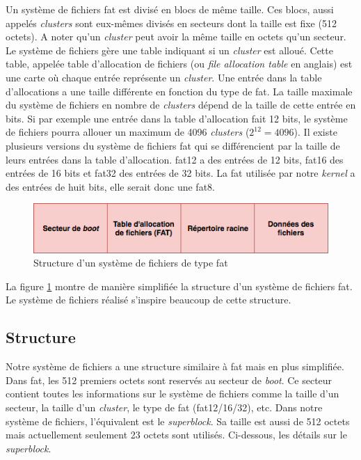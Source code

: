 Un système de fichiers \acrshort{fat} est divisé en blocs de même taille. Ces blocs,
aussi appelés \textit{clusters} sont eux-mêmes divisés en secteurs dont la taille
est fixe (512 octets). A noter qu'un \textit{cluster} peut avoir la même taille
en octets qu'un secteur. Le système de fichiers gère une table indiquant si un
\textit{cluster} est alloué. Cette table, appelée table d'allocation de fichiers
(ou \textit{file allocation table} en anglais) est une carte où chaque entrée
représente un \textit{cluster}. Une entrée dans la table d'allocations a une taille
différente en fonction du type de \acrshort{fat}. La taille maximale du système
de fichiers en nombre de \textit{clusters} dépend de la taille de cette entrée en
bits. Si par exemple une entrée dans la table d'allocation fait 12 bits, le système
de fichiers pourra allouer un maximum de 4096 \textit{clusters} ($2^{12} = 4096$).
Il existe plusieurs versions du système de fichiers \acrshort{fat} qui se
différencient par la taille de leurs entrées dans la table d'allocation.
\acrshort{fat}12 a des entrées de 12 bits, \acrshort{fat}16 des entrées de 16 bits
et \acrshort{fat}32 des entrées de 32 bits. La \acrshort{fat} utilisée par notre
\textit{kernel} a des entrées de huit bits, elle serait donc une \acrshort{fat}8.

\begin{figure}[!h]
  \centering
  \includegraphics[scale=0.65]{images/fat.png}
  \caption{Structure d'un système de fichiers de type \acrshort{fat}}
  \label{fat}
\end{figure}

La figure \ref{fat} montre de manière simplifiée la structure d'un système de fichiers
\acrshort{fat}. Le système de fichiers réalisé s'inspire beaucoup de cette structure.


\subsection{Structure}
Notre système de fichiers a une structure similaire à \acrshort{fat} mais en plus
simplifiée. Dans \acrshort{fat}, les 512 premiers octets sont reservés au secteur
de \textit{boot}. Ce secteur contient toutes les informations sur le système de
fichiers comme la taille d'un secteur, la taille d'un \textit{cluster}, le type
de \acrshort{fat} (\acrshort{fat}12/16/32), etc. Dans notre système de fichiers,
l'équivalent est le \textit{superblock}. Sa taille est aussi de 512 octets mais
actuellement seulement 23 octets sont utilisés. Ci-dessous, les détails sur le
\textit{superblock}.

